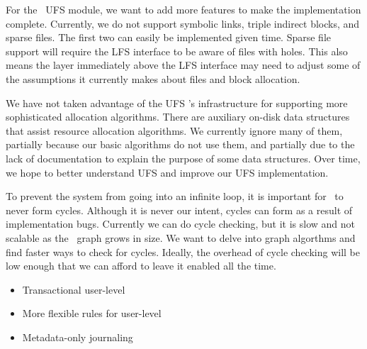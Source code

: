 For the \Kudos\ UFS module, we want to add more features to make the
implementation complete. Currently, we do not support symbolic links, triple
indirect blocks, and sparse files. The first two can easily be implemented
given time. Sparse file support will require the LFS interface to be aware of
files with holes. This also means the layer immediately above the LFS interface
may need to adjust some of the assumptions it currently makes about files and
block allocation.

We have not taken advantage of the UFS \module's infrastructure for supporting
more sophisticated allocation algorithms. There are auxiliary on-disk data
structures that assist resource allocation algorithms. We currently ignore many
of them, partially because our basic algorithms do not use them, and partially
due to the lack of documentation to explain the purpose of some data
structures. Over time, we hope to better understand UFS and improve our UFS
implementation.

To prevent the system from going into an infinite loop, it is important for
\chdescs\ to never form cycles. Although it is never our intent, cycles can
form as a result of implementation bugs. Currently we can do cycle checking,
but it is slow and not scalable as the \chdesc\ graph grows in size. We want to
delve into graph algorthms and find faster ways to check for cycles. Ideally,
the overhead of cycle checking will be low enough that we can afford to leave
it enabled all the time.

\begin{itemize}
\item Transactional user-level \chdescs
\item More flexible rules for user-level \chdescs
\item Metadata-only journaling
\end{itemize}
